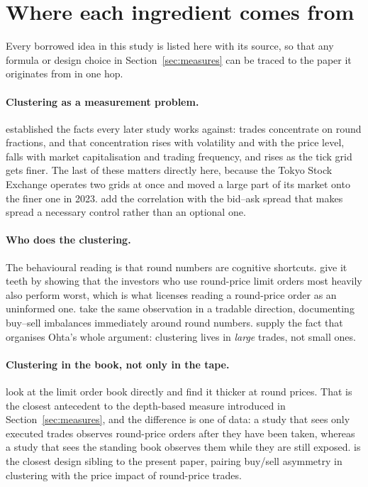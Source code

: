 \section{Where each ingredient comes from}
\label{sec:lit}

Every borrowed idea in this study is listed here with its source, so that any
formula or design choice in Section~\ref{sec:measures} can be traced to the
paper it originates from in one hop.

\paragraph{Clustering as a measurement problem.}
\textcite{Harris1991Clustering} established the facts every later study works
against: trades concentrate on round fractions, and that concentration rises with
volatility and with the price level, falls with market capitalisation and trading
frequency, and rises as the tick grid gets finer. The last of these matters
directly here, because the Tokyo Stock Exchange operates two grids at once and
moved a large part of its market onto the finer one in 2023.
\textcite{ChungVanNessVanNess2004} add the correlation with the bid--ask spread
that makes spread a necessary control rather than an optional one.

\paragraph{Who does the clustering.}
The behavioural reading is that round numbers are cognitive shortcuts.
\textcite{KuoLinZhao2015} give it teeth by showing that the investors who use
round-price limit orders most heavily also perform worst, which is what licenses
reading a round-price order as an uninformed one.
\textcite{BhattacharyaHoldenJacobsen2012} take the same observation in a
tradable direction, documenting buy--sell imbalances immediately around round
numbers. \textcite{DavisVanNessVanNess2014} supply the fact that organises
Ohta's whole argument: clustering lives in \emph{large} trades, not small ones.

\paragraph{Clustering in the book, not only in the tape.}
\textcite{AhnCaiCheung2005} look at the limit order book directly and find it
thicker at round prices. That is the closest antecedent to the depth-based
measure introduced in Section~\ref{sec:measures}, and the difference is one of
data: a study that sees only executed trades observes round-price orders after
they have been taken, whereas a study that sees the standing book observes them
while they are still exposed. \textcite{BoxGriffith2016} is the closest design
sibling to the present paper, pairing buy/sell asymmetry in clustering with the
price impact of round-price trades.

